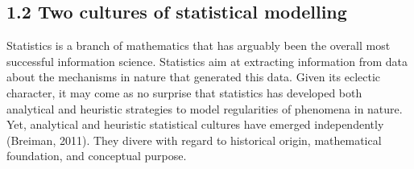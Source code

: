 \documentclass[authoryear,review,3p]{elsarticle}
\begin{document}
\subsection*{1.2 Two cultures of statistical modelling}

Statistics is a branch of mathematics that has arguably been the
overall most successful information science.
Statistics aim at extracting information from data
about the mechanisms in nature that generated this data.
%
Given its eclectic character, it may come as no surprise that statistics
has developed both analytical and heuristic strategies
to model regularities of phenomena in nature.
Yet, analytical and heuristic statistical cultures
have emerged independently (Breiman, 2011).
They divere with regard to historical origin, mathematical foundation,
and conceptual purpose.
\end{document}
